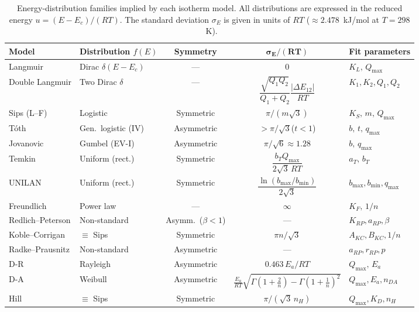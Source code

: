 \documentclass[journal=jacsat,manuscript=article]{achemso}
\begin{document}
\begin{table}[H]
	\centering
	\small
	\caption{Energy-distribution families implied by each isotherm model.
		All distributions are expressed in the reduced energy
		$u = (E - E_c)/(RT)$.  The standard deviation $\sigma_E$ is given
		in units of $RT$ ($\approx 2.478$~kJ/mol at $T = 298$~K).}
	\label{tab:si_energy_dist_families}
	\renewcommand{\arraystretch}{1.5}
	\begin{tabular}{@{} l l c c l @{}}
		\toprule
		\textbf{Model}
		& \textbf{Distribution $f(E)$}
		& \textbf{Symmetry}
		& $\boldsymbol{\sigma_E/(RT)}$
		& \textbf{Fit parameters} \\
		\midrule
		Langmuir
		& Dirac $\delta(E - E_c)$
		& ---
		& $0$
		& $K_L,\, Q_{\max}$ \\
		Double Langmuir
		& Two Dirac $\delta$
		& ---
		& $\dfrac{\sqrt{Q_1Q_2}}{Q_1+Q_2}\dfrac{|\Delta E_{12}|}{RT}$
		& $K_1, K_2, Q_1, Q_2$ \\
		Sips (L--F)
		& Logistic
		& Symmetric
		& $\pi/(m\sqrt{3})$
		& $K_S,\, m,\, Q_{\max}$ \\
		T\'{o}th
		& Gen.\ logistic (IV)
		& Asymmetric
		& $> \pi/\sqrt{3}$\;($t<1$)
		& $b,\, t,\, q_{\max}$ \\
		Jovanovic
		& Gumbel (EV-I)
		& Asymmetric
		& $\pi/\sqrt{6} \approx 1.28$
		& $b,\, q_{\max}$ \\
		Temkin
		& Uniform (rect.)
		& Symmetric
		& $\dfrac{b_T Q_{\max}}{2\sqrt{3}\,RT}$
		& $a_T,\, b_T$ \\
		UNILAN
		& Uniform (rect.)
		& Symmetric
		& $\dfrac{\ln(b_{\max}/b_{\min})}{2\sqrt{3}}$
		& $b_{\max}, b_{\min}, q_{\max}$ \\
		Freundlich
		& Power law
		& ---
		& $\infty$
		& $K_F,\, 1/n$ \\
		Redlich--Peterson
		& Non-standard
		& Asymm.\ ($\beta<1$)
		& ---
		& $K_{RP}, a_{RP}, \beta$ \\
		Koble--Corrigan
		& $\equiv$ Sips
		& Symmetric
		& $\pi n/\sqrt{3}$
		& $A_{KC}, B_{KC}, 1/n$ \\
		Radke--Prausnitz
		& Non-standard
		& Asymmetric
		& ---
		& $a_{RP}, r_{RP}, p$ \\
		D-R
		& Rayleigh
		& Asymmetric
		& $0.463\,E_a/RT$
		& $Q_{\max},\, E_a$ \\
		D-A
		& Weibull
		& Asymmetric
		& $\frac{E_a}{RT}\!\sqrt{\Gamma(1\!+\!\frac{2}{n})\!-\!\Gamma(1\!+\!\frac{1}{n})^2}$
		& $Q_{\max}, E_a, n_{DA}$ \\
		Hill
		& $\equiv$ Sips
		& Symmetric
		& $\pi/(\sqrt{3}\,n_H)$
		& $Q_{\max}, K_D, n_H$ \\
		\bottomrule
	\end{tabular}
\end{table}
\end{document}
